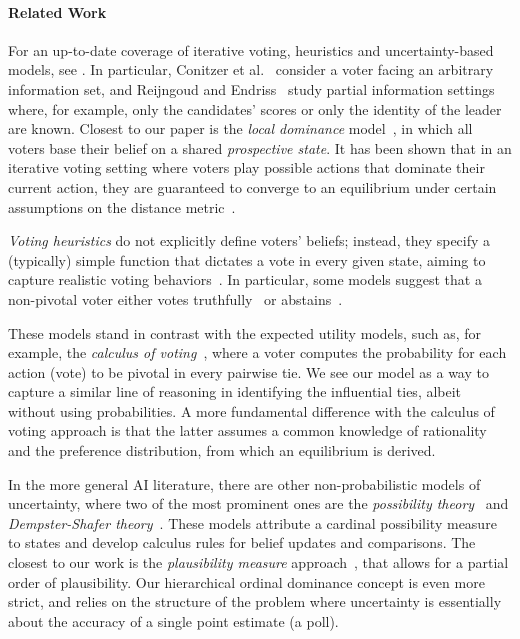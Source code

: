 \documentclass[letterpaper]{article} %
\begin{document}
\paragraph{Related Work}\label{relWork}
For an up-to-date coverage of iterative voting, heuristics and uncertainty-based models, see \cite{ME17}.
In particular, Conitzer et al.~ consider a voter facing an arbitrary information set, and Reijngoud and Endriss~ study partial information settings where, for example, only the candidates' scores or only the identity of the leader are known. Closest to our paper is the \emph{local dominance} model~\cite{MLR14}, in which all voters base their belief on a shared \emph{prospective state}. It has been shown that in an iterative voting setting where voters play possible actions that dominate their current action, they are guaranteed to converge to an equilibrium under certain assumptions on the distance metric~\cite{MLR14,Mei15}.

\emph{Voting heuristics} do not explicitly define voters' beliefs; instead, they specify a (typically) simple function that dictates a vote in every given state, aiming to capture realistic voting behaviors~\cite{RE12,GLRVW13}. In particular, some models suggest that a non-pivotal voter either votes truthfully~\cite{DL10} or abstains~\cite{DE10}.

These models stand in contrast with the expected utility models, such as, for example, the \emph{calculus of voting}~\cite{riker1968theory,MW93}, where a voter computes the probability for each action (vote) to be pivotal in every pairwise tie. We see our model as a way to capture a similar line of reasoning in identifying the influential ties, albeit without using probabilities. A more fundamental difference with the calculus of voting approach is that the latter assumes a common knowledge of rationality and the preference distribution, from which an equilibrium is derived.

In the more general AI literature, there are other non-probabilistic models of uncertainty, where two of the most prominent ones are the \emph{possibility theory}~\cite{DFP96} and \emph{Dempster-Shafer theory}~\cite{shafer1976mathematical}. These models attribute a cardinal possibility measure to states and develop calculus rules for belief updates and comparisons. The closest to our work is the \emph{plausibility measure} approach~\cite{Hal97}, that allows for a partial order of plausibility. Our hierarchical ordinal dominance concept is even more strict, and relies on the structure of the problem where uncertainty is essentially about the accuracy of a single point estimate (a poll).
\end{document}
